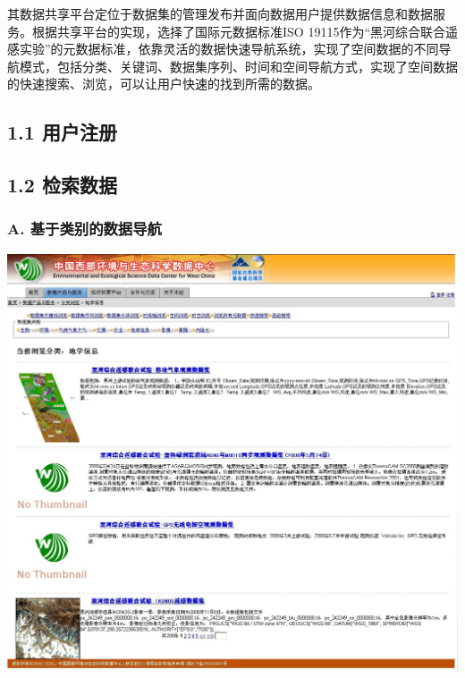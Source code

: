 \documentclass[letterpaper,10pt,english]{sphinxmanual}
\begin{document}
其数据共享平台定位于数据集的管理发布并面向数据用户提供数据信息和数据服务。根据共享平台的实现，选择了国际元数据标准ISO 19115作为“黑河综合联合遥感实验”的元数据标准，依靠灵活的数据快速导航系统，实现了空间数据的不同导航模式，包括分类、关键词、数据集序列、时间和空间导航方式，实现了空间数据的快速搜索、浏览，可以让用户快速的找到所需的数据。


\subsection{1.1 用户注册}
\label{data_acquire:id3}

\subsection{1.2 检索数据}
\label{data_acquire:id4}

\subsubsection{A. 基于类别的数据导航}
\label{data_acquire:a}
{\hfill\includegraphics{westdc_nav_class.jpg}\hfill}
\end{document}
